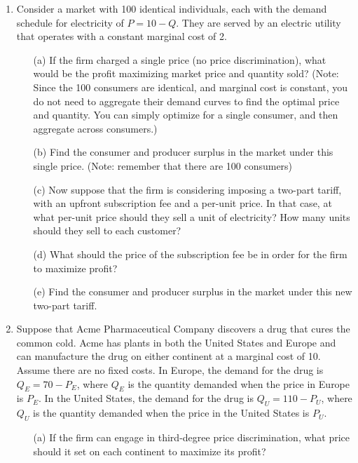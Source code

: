 \documentclass[11pt]{article}
\begin{document}
\begin{enumerate}


  \item Consider a market with 100 identical individuals, each with the demand schedule for electricity of $P = 10 - Q$. They are served by an electric utility that operates with a constant marginal cost of 2.
  
  \begin{enumerate}
    \item[(a)] If the firm charged a single price (no price discrimination), what would be the profit maximizing market price and quantity sold? (Note: Since the 100 consumers are identical, and marginal cost is constant, you do not need to aggregate their demand curves to find the optimal price and quantity. You can simply optimize for a single consumer, and then aggregate across consumers.)

    \item[(b)] Find the consumer and producer surplus in the market under this single price. (Note: remember that there are 100 consumers)

    \item[(c)] Now suppose that the firm is considering imposing a two-part tariff, with an upfront subscription fee and a per-unit price. In that case, at what per-unit price should they sell a unit of electricity? How many units should they sell to each customer?

    \item[(d)] What should the price of the subscription fee be in order for the firm to maximize profit?

    \item[(e)] Find the consumer and producer surplus in the market under this new two-part tariff.
  \end{enumerate}


  \item Suppose that Acme Pharmaceutical Company discovers a drug that cures the common cold. Acme has plants in both the United States and Europe and can manufacture the drug on either continent at a marginal cost of 10. Assume there are no fixed costs. In Europe, the demand for the drug is $Q_{E}=70-P_{E}$, where $Q_{E}$ is the quantity demanded when the price in Europe is $P_{E}$. In the United States, the demand for the drug is $Q_{U}=110-P_{U}$, where $Q_{U}$ is the quantity demanded when the price in the United States is $P_{U}$.
  \begin{enumerate}
    \item[(a)] If the firm can engage in third-degree price discrimination, what price should it set on each continent to maximize its profit?


\end{enumerate}
\end{enumerate}
\end{document}
